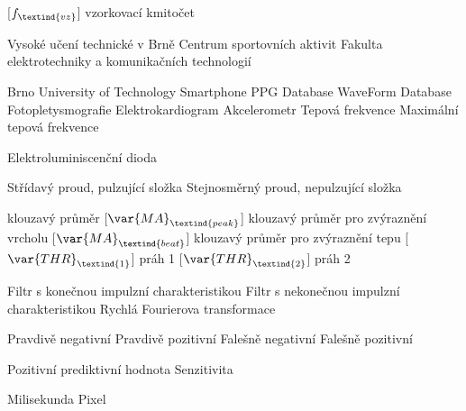 \cleardoublepage
\chapter*{\listofabbrevname}
{}

\begin{acronym}[KolikMista]	%

		[\ensuremath{f_\textind{vz}}]
		{vzorkovací kmitočet}

			{Vysoké učení technické v Brně}
			{Centrum sportovních aktivit}
			{Fakulta elektrotechniky a komunikačních technologií}

		{Brno University of Technology Smartphone PPG Database}
			{WaveForm Database}
			{Fotopletysmografie}
			{Elektrokardiogram}
			{Akcelerometr}
			{Tepová frekvence}
			{Maximální tepová frekvence}

			{Elektroluminiscenční dioda}

			{Střídavý proud, pulzující složka}
			{Stejnosměrný proud, nepulzující složka}

			{klouzavý průměr}
		[\ensuremath{\var{MA}_\textind{peak}}]
			{klouzavý průměr pro zvýraznění vrcholu}
		[\ensuremath{\var{MA}_\textind{beat}}]
		{klouzavý průměr pro zvýraznění tepu}
		[\ensuremath{\var{THR}_\textind{1}}]
		{práh 1}
		[\ensuremath{\var{THR}_\textind{2}}]
		{práh 2}
	
			{Filtr s konečnou impulzní charakteristikou}
			{Filtr s nekonečnou impulzní charakteristikou}
			{Rychlá Fourierova transformace}

			{Pravdivě negativní}	%
			{Pravdivě pozitivní}
			{Falešně negativní}
			{Falešně pozitivní}

			{Pozitivní prediktivní hodnota}
			{Senzitivita}

			{Milisekunda}	%
			{Pixel}			%


\end{acronym}
